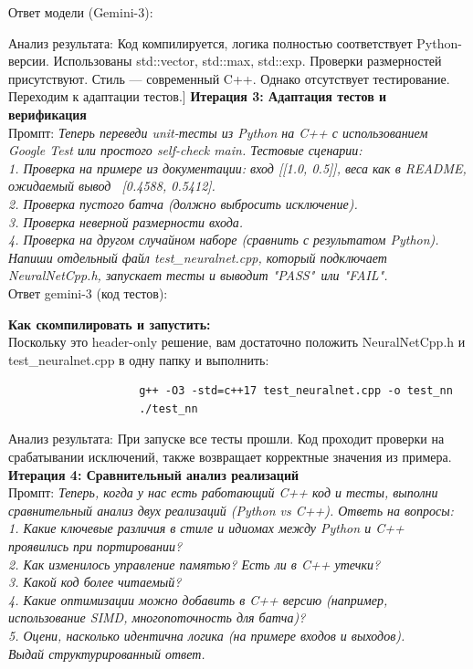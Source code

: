 Ответ модели (Gemini-3):

Анализ результата:
Код компилируется, логика полностью соответствует Python-версии. Использованы std::vector, std::max, std::exp. Проверки размерностей присутствуют. Стиль — современный C++. Однако отсутствует тестирование. Переходим к адаптации тестов.]
\newpage
\noindent
\textbf{Итерация 3: Адаптация тестов и верификация} \\
\indent
Промпт:
\textit{
Теперь переведи unit-тесты из Python на C++ с использованием Google Test или простого self-check main. Тестовые сценарии:\\
1. Проверка на примере из документации: вход [[1.0, 0.5]], веса как в README, ожидаемый вывод ~[0.4588, 0.5412]. \\
2. Проверка пустого батча (должно выбросить исключение).\\
3. Проверка неверной размерности входа.\\
4. Проверка на другом случайном наборе (сравнить с результатом Python).\\
Напиши отдельный файл test\_neuralnet.cpp, который подключает NeuralNetCpp.h, запускает тесты и выводит "PASS"\ или "FAIL".
} \\
\newline
Ответ gemini-3 (код тестов):

\noindent
\textbf{Как скомпилировать и запустить:} \\
\indent
Поскольку это header-only решение, вам достаточно положить NeuralNetCpp.h и test\_neuralnet.cpp в одну папку и выполнить:
\begin{verbatim}
					g++ -O3 -std=c++17 test_neuralnet.cpp -o test_nn
					./test_nn
\end{verbatim}
Анализ результата:
При запуске все тесты прошли. Код проходит проверки на срабатывании исключений, также возвращает корректные значения из примера.
\newpage
\noindent
\textbf{Итерация 4: Сравнительный анализ реализаций} \\
\indent
Промпт:
\textit{
Теперь, когда у нас есть работающий C++ код и тесты, выполни сравнительный анализ двух реализаций (Python vs C++). Ответь на вопросы: \\
1. Какие ключевые различия в стиле и идиомах между Python и C++ проявились при портировании?\\
2. Как изменилось управление памятью? Есть ли в C++ утечки?\\
3. Какой код более читаемый?\\
4. Какие оптимизации можно добавить в C++ версию (например, использование SIMD, многопоточность для батча)?\\
5. Оцени, насколько идентична логика (на примере входов и выходов).\\
Выдай структурированный ответ.\\
}\\
